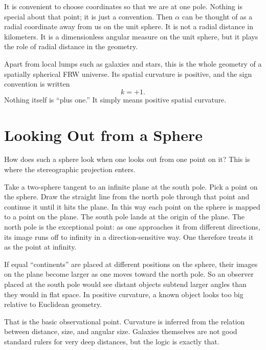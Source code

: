 It is convenient to choose coordinates so that we are at one pole. Nothing is special about that point; it is just a convention. Then \(\alpha\) can be thought of as a radial coordinate away from us on the unit sphere. It is not a radial distance in kilometers. It is a dimensionless angular measure on the unit sphere, but it plays the role of radial distance in the geometry.

Apart from local lumps such as galaxies and stars, this is the whole geometry of a spatially spherical FRW universe. Its spatial curvature is positive, and the sign convention is written
\begin{equation}
k=+1.
\end{equation}
Nothing itself is ``plus one.'' It simply means positive spatial curvature.

\section{Looking Out from a Sphere}

How does such a sphere look when one looks out from one point on it? This is where the stereographic projection enters.

Take a two-sphere tangent to an infinite plane at the south pole. Pick a point on the sphere. Draw the straight line from the north pole through that point and continue it until it hits the plane. In this way each point on the sphere is mapped to a point on the plane. The south pole lands at the origin of the plane. The north pole is the exceptional point: as one approaches it from different directions, its image runs off to infinity in a direction-sensitive way. One therefore treats it as the point at infinity.

If equal ``continents'' are placed at different positions on the sphere, their images on the plane become larger as one moves toward the north pole. So an observer placed at the south pole would see distant objects subtend larger angles than they would in flat space. In positive curvature, a known object looks too big relative to Euclidean geometry.

That is the basic observational point. Curvature is inferred from the relation between distance, size, and angular size. Galaxies themselves are not good standard rulers for very deep distances, but the logic is exactly that.

\begin{classroomqa}
\end{classroomqa}

